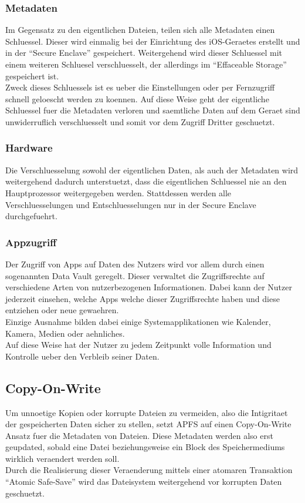 \subsubsection{Metadaten}
Im Gegensatz zu den eigentlichen Dateien, teilen sich alle Metadaten einen Schluessel. Dieser wird einmalig bei der Einrichtung des iOS-Geraetes erstellt und in der “Secure Enclave” gespeichert. Weitergehend wird dieser Schluessel mit einem weiteren Schluesel verschluesselt, der allerdings im “Effaceable Storage” gespeichert ist.\\
Zweck dieses Schluessels ist es ueber die Einstellungen oder per Fernzugriff schnell geloescht werden zu koennen. Auf diese Weise geht der eigentliche Schluessel fuer die Metadaten verloren und saemtliche Daten auf dem Geraet sind unwiderruflich verschluesselt und somit vor dem Zugriff Dritter geschuetzt.
\subsubsection{Hardware}
Die Verschluesselung sowohl der eigentlichen Daten, als auch der Metadaten wird weitergehend dadurch unterstuetzt, dass die eigentlichen Schluessel nie an den Hauptprozessor weitergegeben werden. Stattdessen werden alle Verschluesselungen und Entschluesselungen nur in der Secure Enclave durchgefuehrt.
\subsubsection{Appzugriff}
Der Zugriff von Apps auf Daten des Nutzers wird vor allem durch einen sogenannten Data Vault geregelt. Dieser verwaltet die Zugriffsrechte auf verschiedene Arten von nutzerbezogenen Informationen. Dabei kann der Nutzer jederzeit einsehen, welche Apps welche dieser Zugriffsrechte haben und diese entziehen oder neue gewaehren.\\
Einzige Ausnahme bilden dabei einige Systemapplikationen wie Kalender, Kamera, Medien oder aehnliches.\\
Auf diese Weise hat der Nutzer zu jedem Zeitpunkt volle Information und Kontrolle ueber den Verbleib seiner Daten.

\subsection{Copy-On-Write}
Um unnoetige Kopien oder korrupte Dateien zu vermeiden, also die Intigritaet der gespeicherten Daten sicher zu stellen, setzt APFS auf einen Copy-On-Write Ansatz fuer die Metadaten von Dateien. Diese Metadaten werden also erst geupdated, sobald eine Datei beziehungsweise ein Block des Speichermediums wirklich veraendert werden soll.\\
Durch die Realisierung dieser Veraenderung mittels einer atomaren Transaktion “Atomic Safe-Save” wird das Dateisystem weitergehend vor korrupten Daten geschuetzt.

